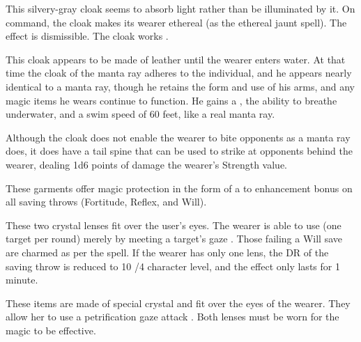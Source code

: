  This silvery-gray cloak seems to absorb light rather than be illuminated by it. On command, the cloak makes its wearer ethereal (as the ethereal jaunt spell). The effect is dismissible. The cloak works .

 This cloak appears to be made of leather until the wearer enters water. At that time the cloak of the manta ray adheres to the individual, and he appears nearly identical to a manta ray, though he retains the form and use of his arms, and any magic items he wears continue to function. He gains a  , the ability to breathe underwater, and a swim speed of 60 feet, like a real manta ray.

Although the cloak does not enable the wearer to bite opponents as a manta ray does, it does have a tail spine that can be used to strike at opponents behind the wearer, dealing 1d6 points of damage \add the wearer's Strength value.

  These garments offer magic protection in the form of a  to  enhancement bonus on all saving throws (Fortitude, Reflex, and Will).

 These two crystal lenses fit over the user's eyes. The wearer is able to use  (one target per round) merely by meeting a target's gaze . Those failing a Will save are charmed as per the spell. If the wearer has only one lens, the DR of the saving throw is reduced to 10 /4 character level, and the effect only lasts for 1 minute.

 These items are made of special crystal and fit over the eyes of the wearer. They allow her to use a petrification gaze attack . Both lenses must be worn for the magic to be effective.

